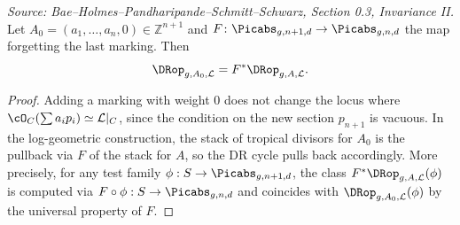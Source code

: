 \begin{lemma}
  \label{lem:invariance_unweighted_marking}
  \textit{Source: Bae--Holmes--Pandharipande--Schmitt--Schwarz, Section 0.3, Invariance II.}
  Let $A_0 = (a_1,\ldots,a_n,0) \in \mathbb{Z}^{n+1}$ and
  $F\colon \Picabs_{g,n+1,d} \to \Picabs_{g,n,d}$ the map forgetting the last marking.
  Then
  \[
    \DRop_{g,A_0,\mathcal{L}} = F^* \DRop_{g,A,\mathcal{L}}.
  \]
\end{lemma}

\begin{proof}
  Adding a marking with weight $0$ does not change the locus where
  $\cO_C(\sum a_i p_i) \simeq \mathcal{L}|_C$, since the condition on the new section $p_{n+1}$
  is vacuous.  In the log-geometric construction, the stack of tropical divisors for $A_0$
  is the pullback via $F$ of the stack for $A$, so the DR cycle pulls back accordingly.
  More precisely, for any test family $\phi: S \to \Picabs_{g,n+1,d}$, the class
  $F^*\DRop_{g,A,\mathcal{L}}(\phi)$ is computed via $F\circ\phi: S\to\Picabs_{g,n,d}$
  and coincides with $\DRop_{g,A_0,\mathcal{L}}(\phi)$ by the universal property of $F$.
\end{proof}

